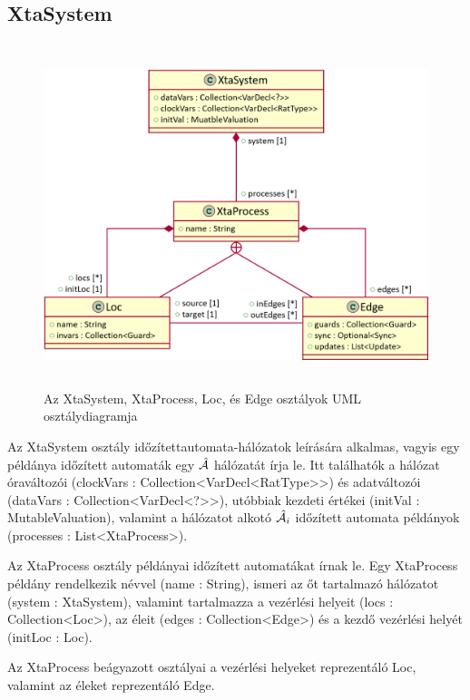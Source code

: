 \subsection{XtaSystem}
\begin{figure}%
    \centering
    \includegraphics[height=100mm, keepaspectratio]{src/figures/xtasystem-uml.png}
    \caption{Az \textsf{XtaSystem}, \textsf{XtaProcess}, \textsf{Loc}, és \textsf{Edge} osztályok UML osztálydiagramja}
    \label{fig:xtasystem-uml}
\end{figure}

Az \textsf{XtaSystem} osztály időzítettautomata-hálózatok leírására alkalmas, vagyis egy példánya időzített automaták egy $\hat{\mathcal{A}}$ hálózatát írja le. Itt találhatók a hálózat óraváltozói (\textsf{clockVars : Collection<VarDecl<RatType>{}>}) és adatváltozói (\textsf{dataVars : Collection<VarDecl<?>{}>}), utóbbiak kezdeti értékei (\textsf{initVal : MutableValuation}), valamint a hálózatot alkotó $\hat{\mathcal{A}}_i$ időzített automata példányok (\textsf{processes : List<XtaProcess>}).

Az \textsf{XtaProcess} osztály példányai időzített automatákat írnak le. Egy \textsf{XtaProcess} példány rendelkezik névvel (\textsf{name : String}), ismeri az őt tartalmazó hálózatot (\textsf{system : XtaSystem}), valamint tartalmazza a vezérlési helyeit (\textsf{locs : Collection<Loc>}), az éleit (\textsf{edges : Collection<Edge>}) és a kezdő vezérlési helyét (\textsf{initLoc : Loc}).

Az \textsf{XtaProcess} beágyazott osztályai a vezérlési helyeket reprezentáló \textsf{Loc}, valamint az éleket reprezentáló \textsf{Edge}.

